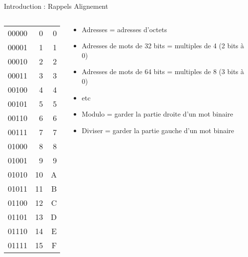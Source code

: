 \begin{Frame}{Introduction : Rappels Alignement}
 \begin{columns}[t]
  \begin{column}{\BW}
    \begin{block}{}\tiny
      \begin{tabular}{|r r r|}\hline
        00000&0 &0                             \\
        00001&1 &1                             \\
        00010&2 &2                             \\
        00011&3 &3                             \\ \hline
        00100&4 &4                             \\
        00101&5 &5                             \\
        00110&6 &6                             \\
        00111&7 &7                             \\ \hline \hline
        01000&8 &8                             \\
        01001&9 &9                             \\
        01010&10&A                             \\
        01011&11&B                             \\ \hline
        01100&12&C                             \\
        01101&13&D                             \\
        01110&14&E                             \\
        01111&15&F                             \\ \hline
      \end{tabular}
    \end{block}
  \end{column}
  \begin{column}{\BW}
    \begin{block}{}
      \begin{itemize}
      \item Adresses = adresses d'octets
      \item Adresses de mots de 32 bits = multiples de 4 (2
        bits à 0)
      \item Adresses de mots de 64 bits = multiples de 8 (3
        bits à 0)
      \item etc
      \end{itemize}
    \end{block}
    \begin{block}{}
      \begin{itemize}
      \item  Modulo = garder la partie droite d'un mot binaire
      \item  Diviser = garder la partie gauche d'un mot binaire
      \end{itemize}
    \end{block}
  \end{column}

 \end{columns}
\end{Frame}
